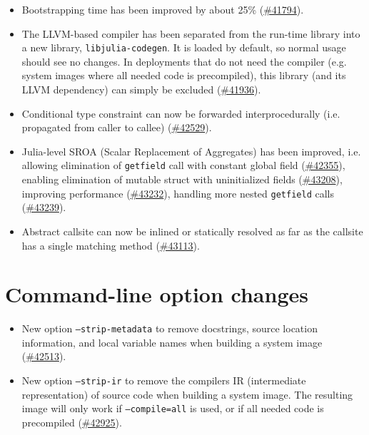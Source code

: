 \begin{itemize}
\item Bootstrapping time has been improved by about 25\% (\href{https://github.com/JuliaLang/julia/issues/41794}{\#41794}).


\item The LLVM-based compiler has been separated from the run-time library into a new library, \texttt{libjulia-codegen}. It is loaded by default, so normal usage should see no changes. In deployments that do not need the compiler (e.g. system images where all needed code is precompiled), this library (and its LLVM dependency) can simply be excluded (\href{https://github.com/JuliaLang/julia/issues/41936}{\#41936}).


\item Conditional type constraint can now be forwarded interprocedurally (i.e. propagated from caller to callee) (\href{https://github.com/JuliaLang/julia/issues/42529}{\#42529}).


\item Julia-level SROA (Scalar Replacement of Aggregates) has been improved, i.e. allowing elimination of \texttt{getfield} call with constant global field (\href{https://github.com/JuliaLang/julia/issues/42355}{\#42355}), enabling elimination of mutable struct with uninitialized fields (\href{https://github.com/JuliaLang/julia/issues/43208}{\#43208}), improving performance (\href{https://github.com/JuliaLang/julia/issues/43232}{\#43232}), handling more nested \texttt{getfield} calls (\href{https://github.com/JuliaLang/julia/issues/43239}{\#43239}).


\item Abstract callsite can now be inlined or statically resolved as far as the callsite has a single matching method (\href{https://github.com/JuliaLang/julia/issues/43113}{\#43113}).

\end{itemize}


\hypertarget{5697668691293835936}{}


\chapter{Command-line option changes}



\begin{itemize}
\item New option \texttt{--strip-metadata} to remove docstrings, source location information, and local variable names when building a system image (\href{https://github.com/JuliaLang/julia/issues/42513}{\#42513}).


\item New option \texttt{--strip-ir} to remove the compiler{\textquotesingle}s IR (intermediate representation) of source code when building a system image. The resulting image will only work if \texttt{--compile=all} is used, or if all needed code is precompiled (\href{https://github.com/JuliaLang/julia/issues/42925}{\#42925}).

\end{itemize}


